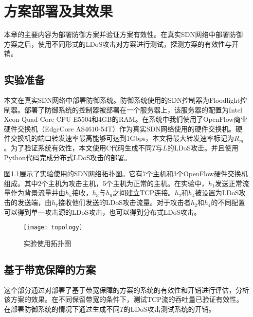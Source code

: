 \chapter{方案部署及其效果}
\label{cha:experiment}
本章的主要内容为部署防御方案并验证方案有效性。在真实SDN网络中部署防御方案之后，使用不同形式的LDoS攻击对方案进行测试，探测方案的有效性与开销。

\section{实验准备}
\label{chap5:setup}
本文在真实SDN网络中部署防御系统。防御系统使用的SDN控制器为Floodlight控制器。部署了防御系统的控制器被部署在一个服务器上，该服务器的配置为Intel Xeon Quad-Core CPU E5504和4GB的RAM。在系统中我们使用了OpenFlow商业硬件交换机（EdgeCore AS4610-54T）作为真实SDN网络使用的硬件交换机。硬件交换机的端口转发速率最高能够可达到1Gbps，本文将最大转发速率标记为$R_m$。为了验证系统有效性，本文使用C代码生成不同$T$与$L$的LDoS攻击。并且使用Python代码完成分布式LDoS攻击的部署。

图\ref{fig:topology}展示了实验使用的SDN网络拓扑图。它有7个主机和3个OpenFlow硬件交换机组成。其中2个主机为攻击主机，5个主机为正常的主机。在实验中，$h_1$发送正常流量作为背景流量并由$h_5$接收，$h_3$与$h_6$之间建立TCP连接。$h_2$和$h_4$被设置为LDoS攻击的发送端，由$h_7$接收他们发送的LDoS攻击流量。对于攻击者$h_2$和$h_4$的不同配置可以得到单一攻击源的LDoS攻击，也可以得到分布式LDoS攻击。


\begin{figure}
    \centering
    \texttt{[image: topology]}
    \caption{实验使用拓扑图}
    \label{fig:topology}
\end{figure}


\section{基于带宽保障的方案}
\label{chap5:bandwidth-reserve-solution}

这个部分通过对部署了基于带宽保障的方案的系统的有效性和开销进行评估，分析该方案的效果。在不同保留带宽的条件下，测试TCP流的吞吐量已验证有效性。在部署防御系统的情况下通过生成不同$T$的LDoS攻击测试系统的开销。

